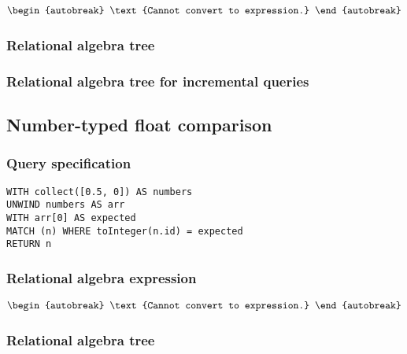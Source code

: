 \begin{align*}
\begin{autobreak}
\text{Cannot convert to expression.}
\end{autobreak}
\end{align*}

\subsubsection*{Relational algebra tree}


\subsubsection*{Relational algebra tree for incremental queries}


\subsection{Number-typed float comparison}

\subsubsection*{Query specification}

\begin{lstlisting}
WITH collect([0.5, 0]) AS numbers
UNWIND numbers AS arr
WITH arr[0] AS expected
MATCH (n) WHERE toInteger(n.id) = expected
RETURN n
\end{lstlisting}

\subsubsection*{Relational algebra expression}

\begin{align*}
\begin{autobreak}
\text{Cannot convert to expression.}
\end{autobreak}
\end{align*}

\subsubsection*{Relational algebra tree}


